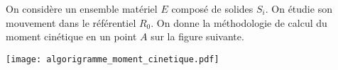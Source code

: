On considère un ensemble matériel $E$ composé de solides $S_i$. On étudie son mouvement dans le référentiel $R_0$.
On donne la méthodologie de calcul du moment cinétique en un point $A$ sur la figure suivante.%

\begin{center}
\texttt{[image: algorigramme\_moment\_cinetique.pdf]}
\end{center}

%
%
%
%
%
%
%
